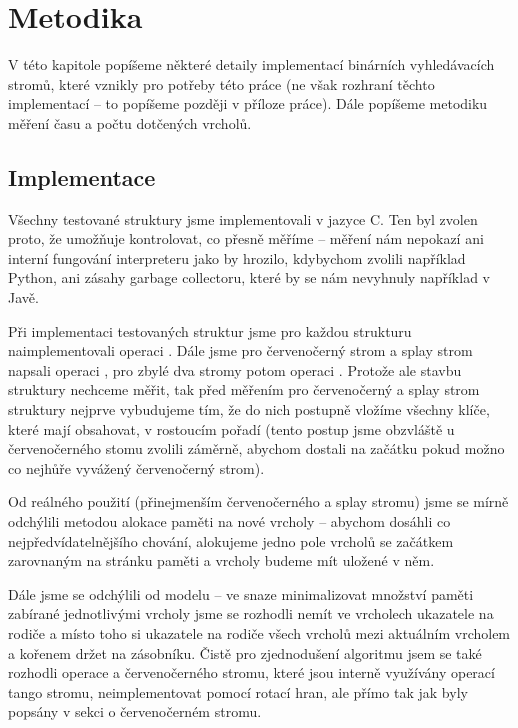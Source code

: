 \chapter{Metodika}

V této kapitole popíšeme některé detaily implementací binárních vyhledávacích stromů, které vznikly pro potřeby této práce (ne však rozhraní těchto implementací -- to popíšeme později v příloze práce). Dále popíšeme metodiku měření času a počtu dotčených vrcholů.

\section{Implementace}

Všechny testované struktury jsme implementovali v jazyce C. Ten byl zvolen proto, že umožňuje kontrolovat, co přesně měříme -- měření nám nepokazí ani interní fungování interpreteru jako by hrozilo, kdybychom zvolili například Python, ani zásahy garbage collectoru, které by se nám nevyhnuly například v Javě.

Při implementaci testovaných struktur jsme pro každou strukturu
naimplementovali operaci . Dále jsme pro červenočerný strom a splay
strom napsali operaci , pro zbylé dva stromy potom operaci
. Protože ale stavbu struktury nechceme měřit, tak před měřením pro
červenočerný a splay strom struktury nejprve vybudujeme tím, že do nich
postupně vložíme všechny klíče, které mají obsahovat, v rostoucím pořadí (tento postup jsme obzvláště u červenočerného stomu zvolili záměrně, abychom dostali na začátku pokud možno co nejhůře vyvážený červenočerný strom). 

Od reálného použití (přinejmenším červenočerného a splay stromu) jsme se mírně odchýlili metodou alokace paměti na nové vrcholy -- abychom dosáhli co nejpředvídatelnějšího chování, alokujeme jedno pole vrcholů se začátkem zarovnaným na stránku paměti a vrcholy budeme mít uložené v něm.

Dále jsme se odchýlili od modelu -- ve snaze minimalizovat množství paměti zabírané jednotlivými vrcholy jsme se rozhodli nemít ve vrcholech ukazatele na rodiče a místo toho si ukazatele na rodiče všech vrcholů mezi aktuálním vrcholem a kořenem držet na zásobníku. Čistě pro zjednodušení algoritmu jsem se také rozhodli operace  a  červenočerného stromu, které jsou interně využívány operací  tango stromu, neimplementovat pomocí rotací hran, ale přímo tak jak byly popsány v sekci o červenočerném stromu. 

